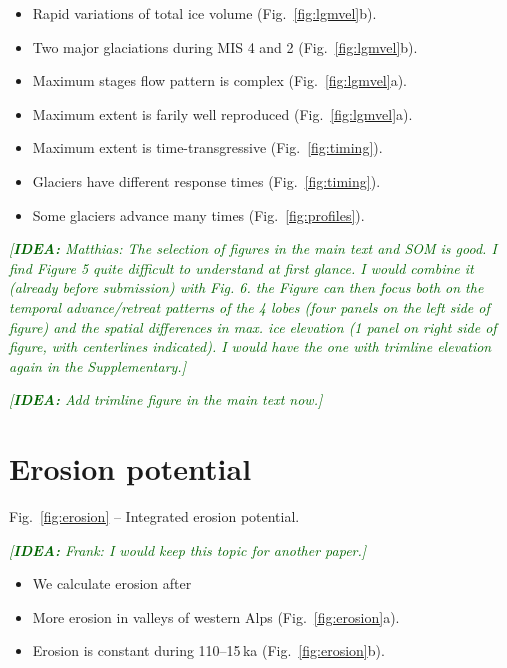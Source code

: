 \documentclass{article}
\newcommand{\idea}[1]{\textcolor{darkgreen}{\emph{[\textbf{IDEA:} #1]}}}
\begin{document}
    \begin{itemize}
    \item Rapid variations of total ice volume (Fig.~\ref{fig:lgmvel}b).
    \item Two major glaciations during MIS 4 and 2 (Fig.~\ref{fig:lgmvel}b).
    \item Maximum stages flow pattern is complex (Fig.~\ref{fig:lgmvel}a).
    \item Maximum extent is farily well reproduced (Fig.~\ref{fig:lgmvel}a).
    \item Maximum extent is time-transgressive (Fig.~\ref{fig:timing}).
    \item Glaciers have different response times (Fig.~\ref{fig:timing}).
    \item Some glaciers advance many times (Fig.~\ref{fig:profiles}).
    \end{itemize}

    \idea{Matthias: The selection of figures in the main text and SOM is good.
          I find Figure 5 quite difficult to understand at first glance. I
          would combine it (already before submission) with Fig. 6. the Figure
          can then focus both on the temporal advance/retreat patterns of the 4
          lobes (four panels on the left side of figure) and the spatial
          differences in max. ice elevation (1 panel on right side of figure,
          with centerlines indicated). I would have the one with trimline
          elevation again in the Supplementary.}

    \idea{Add trimline figure in the main text now.}


\section{Erosion potential}

    Fig.~\ref{fig:erosion} -- Integrated erosion potential.

    \idea{Frank: I would keep this topic for another paper.}

    \begin{itemize}
    \item We calculate erosion after \citet{Herman.etal.2015}
    \item More erosion in valleys of western Alps (Fig.~\ref{fig:erosion}a).
    \item Erosion is constant during 110--15\,ka (Fig.~\ref{fig:erosion}b).
    \end{itemize}
\end{document}
